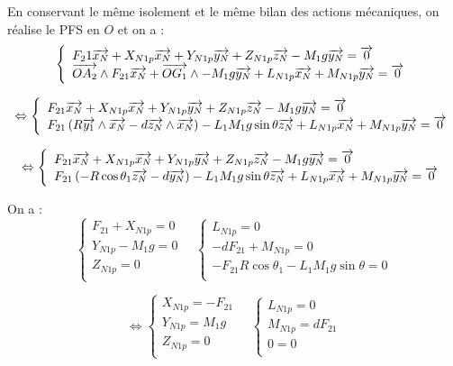 \documentclass[10pt,fleqn]{article} %
\begin{document}
\begin{multicols}{2}
\begin{corrige}
En conservant le même isolement et le même bilan des actions mécaniques, on réalise le PFS en $O$ et on a : 
$$
\left\{
\begin{array}{l}
F_21\overrightarrow{x_N}+X_{N1p}\overrightarrow{x_N}+Y_{N1p}\overrightarrow{y_N}+Z_{N1p}\overrightarrow{z_N} - M_1g\overrightarrow{y_N} = \overrightarrow{0}\\
\overrightarrow{OA_2}\wedge F_{21}\overrightarrow{x_N}  + 
\overrightarrow{OG_1}\wedge -M_1g\overrightarrow{y_N}  +L_{N1p}\overrightarrow{x_N}+M_{N1p}\overrightarrow{y_N}= \overrightarrow{0} \\
\end{array}
\right.
$$



$$ \Leftrightarrow
\left\{
\begin{array}{l}
F_{21}\overrightarrow{x_N}+X_{N1p}\overrightarrow{x_N}+Y_{N1p}\overrightarrow{y_N}+Z_{N1p}\overrightarrow{z_N} - M_1g\overrightarrow{y_N} = \overrightarrow{0}\\
 F_{21}\left( R\overrightarrow{y_1} \wedge \overrightarrow{x_N}- d\overrightarrow{z_N}\wedge \overrightarrow{x_N}\right)  
-L_1M_1g \sin \theta \overrightarrow{z_N} +L_{N1p}\overrightarrow{x_N}+M_{N1p}\overrightarrow{y_N} = \overrightarrow{0} \\
\end{array}
\right.
$$

$$ \Leftrightarrow
\left\{
\begin{array}{l}
F_{21}\overrightarrow{x_N}+X_{N1p}\overrightarrow{x_N}+Y_{N1p}\overrightarrow{y_N}+Z_{N1p}\overrightarrow{z_N} - M_1g\overrightarrow{y_N} = \overrightarrow{0}\\
 F_{21}\left( - R\cos\theta_1\overrightarrow{z_N}- d\overrightarrow{y_N}\right)  
-L_1M_1g \sin \theta \overrightarrow{z_N} +L_{N1p}\overrightarrow{x_N}+M_{N1p}\overrightarrow{y_N} = \overrightarrow{0} \\
\end{array}
\right.
$$

On a : 
$$
\left\{
\begin{array}{l}
F_{21}+X_{N1p} = 0 \\
Y_{N1p}- M_1g = 0 \\
Z_{N1p}=0 \\
\end{array}
\right.
\quad
\left\{
\begin{array}{l}
 L_{N1p} = {0} \\
- dF_{21}+M_{N1p} = {0} \\
-F_{21}  R\cos\theta_1-L_1M_1g \sin \theta  = {0} \\
\end{array}
\right.
$$

$$
\Leftrightarrow
\left\{
\begin{array}{l}
X_{N1p} = - F_{21}\\
Y_{N1p}= M_1g  \\
Z_{N1p}=0 \\
\end{array}
\right.
\quad
\left\{
\begin{array}{l}
 L_{N1p} = {0} \\
M_{N1p} =dF_{21} \\
0 = 0\\
\end{array}
\right.
$$




\end{corrige}
\end{multicols}
\end{document}

